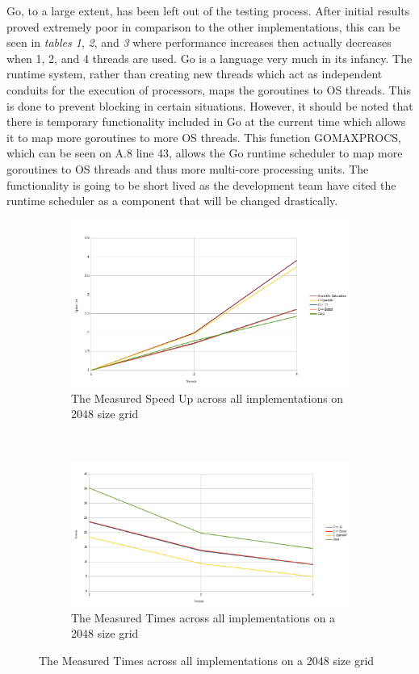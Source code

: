 \documentclass[11pt]{article} %
\begin{document}
Go, to a large extent, has been left out of the testing process. After initial results proved extremely poor in comparison to the other implementations, this can be seen in {\it tables 1}, {\it 2}, and {\it 3} where performance increases then actually decreases when 1, 2, and 4 threads are used. Go is a language very much in its infancy. The runtime system, rather than creating new threads which act as independent conduits for the execution of processors, maps the goroutines to OS threads. This is done to prevent blocking in certain situations. However, it should be noted that there is temporary functionality included in Go at the current time which allows it to map more goroutines to more OS threads. This function GOMAXPROCS, which can be seen on A.8 line 43, allows the Go runtime scheduler to map more goroutines to OS threads and thus more multi-core processing units. The functionality is going to be short lived as the development team have cited the runtime scheduler as a component that will be changed drastically. 
\begin{figure}[]
\centering
\begin{subfigure}[b]{1.1\textwidth}
\centering
\includegraphics[width=\textwidth]{measuredSpeedup2048.png}
\caption{The Measured Speed Up across all implementations on 2048 size grid}
\label{fig: speedup1}
\end{subfigure}
~ 
\begin{subfigure}[b]{1.1\textwidth}
\centering
\includegraphics[width=\textwidth]{measured204810004.png}
\caption{The Measured Times across all implementations on a 2048 size grid}
\label{fig: measured1}
\end{subfigure}
\end{figure}
\end{document}
